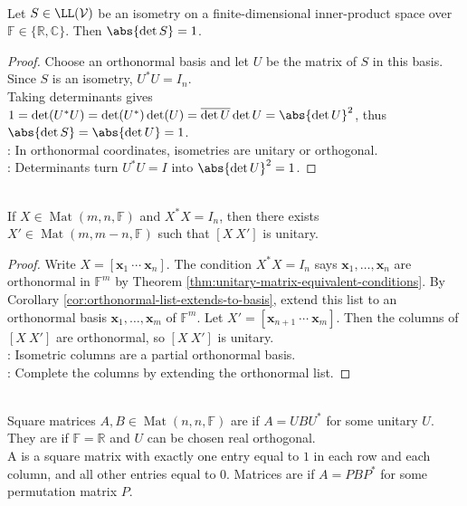 \begin{proposition} \label{prop:isometry-determinant-absolute-one} \\
Let $S\in\LL(\mathcal{V})$ be an isometry on a finite-dimensional inner-product space over $\mathbb{F}\in\{\mathbb{R},\mathbb{C}\}$. Then $\abs{\det S}=1$.
\begin{proof}
Choose an orthonormal basis and let $U$ be the matrix of $S$ in this basis. Since $S$ is an isometry, $U^*U=I_n$.\\
Taking determinants gives $1=\det(U^*U)=\det(U^*)\det(U)=\overline{\det U}\det U=\abs{\det U}^2$, thus $\abs{\det S}=\abs{\det U}=1$.\\
: In orthonormal coordinates, isometries are unitary or orthogonal.\\
: Determinants turn $U^*U=I$ into $\abs{\det U}^2=1$.
\end{proof}
\end{proposition}

\begin{theorem} \label{thm:extend-isometric-columns-to-unitary-matrix} \\
If $X\in\operatorname{Mat}(m,n,\mathbb{F})$ and $X^*X=I_n$, then there exists $X'\in\operatorname{Mat}(m,m-n,\mathbb{F})$ such that $[X\ X']$ is unitary.
\begin{proof}
Write $X=[\mathbf{x}_1\ \cdots\ \mathbf{x}_n]$. The condition $X^*X=I_n$ says $\mathbf{x}_1,\ldots,\mathbf{x}_n$ are orthonormal in $\mathbb{F}^m$ by Theorem \ref{thm:unitary-matrix-equivalent-conditions}. By Corollary \ref{cor:orthonormal-list-extends-to-basis}, extend this list to an orthonormal basis $\mathbf{x}_1,\ldots,\mathbf{x}_m$ of $\mathbb{F}^m$. Let $X'=[\mathbf{x}_{n+1}\ \cdots\ \mathbf{x}_m]$. Then the columns of $[X\ X']$ are orthonormal, so $[X\ X']$ is unitary.\\
: Isometric columns are a partial orthonormal basis.\\
: Complete the columns by extending the orthonormal list.
\end{proof}
\end{theorem}

\begin{definition} \label{def:unitary-and-permutation-similarity} \\
Square matrices $A,B\in\operatorname{Mat}(n,n,\mathbb{F})$ are  if $A=UBU^*$ for some unitary $U$. They are  if $\mathbb{F}=\mathbb{R}$ and $U$ can be chosen real orthogonal.\\
A  is a square matrix with exactly one entry equal to $1$ in each row and each column, and all other entries equal to $0$. Matrices are  if $A=PBP^*$ for some permutation matrix $P$.
\end{definition}

